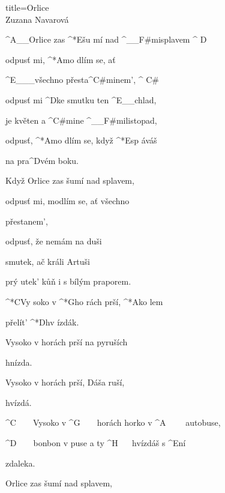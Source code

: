 \begin{song}{title=\predtitle\centering Orlice \\\large Zuzana Navarová  \vspace*{-0.3cm}}  %
\begin{centerjustified}

\begin{varwidth}[t]{0.48\textwidth}\setlength{\parindent}{\pindent}  %
\sloka
	^{A{\color{white}\_\_}}Orlice zas ^*{E}šu mí nad ^{{\color{white}\_\_}F#mi}splavem ^{\,\,D} 
	
	odpusť mi, ^*{A}mo dlím se, ať 

	^{E{\color{white}\_\_\_}}všechno přesta^{C#mi}nem', ^{\,\,C#}
	
	odpusť mi ^{D}ke smutku ten ^{E{\color{white}\_\_}}chlad,
	
	je květen a ^{C#mi}ne ^{{\color{white}\_\_}F#mi}listopad, 
	
	odpusť, ^*{A}mo dlím se, když ^*{E}sp áváš 

	na pra^{D}vém boku. 
	
\sloka
	Když Orlice zas šumí nad splavem, 
	
	odpusť mi, modlím se, ať všechno 

	přestanem',
	
	odpusť, že nemám na duši
	
	smutek, ač králi Artuši 
	
	prý utek' kůň i s bílým praporem.
	
	^*{C}Vy soko v ^*{G}ho rách prší, ^*{A}ko lem 

	přelít' ^*{D}hv ízdák. 
	
	Vysoko v horách prší na pyruších 

	hnízda. 
	
	Vysoko v horách prší, Dáša ruší, 

	hvízdá. 
	
	^{C\,\,\,\,\,\,\,\,\,\,\,\,}Vysoko v ^{G\,\,\,\,\,\,\,\,\,\,\,\,}horách 
	horko v ^{A\,\,\,\,\,\,\,\,\,\,\,\,\,\,}autobuse, 

	^{D\,\,\,\,\,\,\,\,\,\,\,\,}bonbon v puse
	a ty ^{H\,\,\,\,\,\,\,\,\,\,}hvízdáš s ^{E}ní 

	zdaleka. 

\end{varwidth}\mezisloupci\begin{varwidth}[t]{0.5\textwidth}\setlength{\parindent}{\pindent}
\vspace*{0.4425cm}
\sloka
	Orlice zas šumí nad splavem, 
	

\end{varwidth}
\end{centerjustified}
\end{song}
